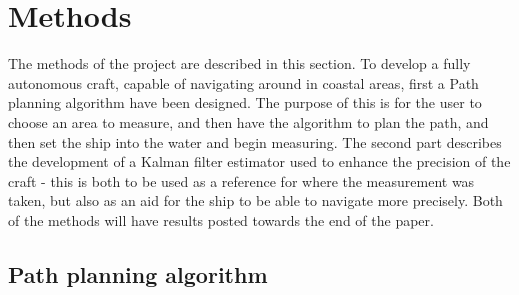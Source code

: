 \documentclass{ifacconf}
\begin{document}
\section{Methods}

The methods of the project are described in this section. To develop a fully autonomous craft, capable of navigating around in coastal areas, first a Path planning algorithm have been designed. The purpose of this is for the user to choose an area to measure, and then have the algorithm to plan the path, and then set the ship into the water and begin measuring. The second part describes the development of a Kalman filter estimator used to enhance the precision of the craft - this is both to be used as a reference for where the measurement was taken, but also as an aid for the ship to be able to navigate more precisely. Both of the methods will have results posted towards the end of the paper. 

\subsection{Path planning algorithm}
\end{document}

